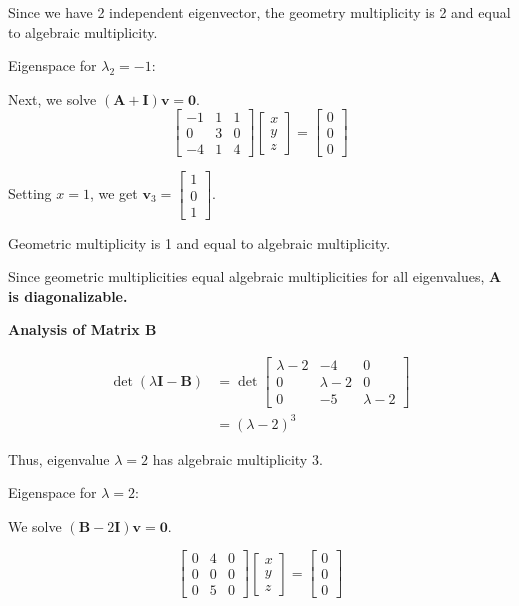 \documentclass{article}
\newcommand{\0}{{\mathbf{0}}} %
\begin{document}
Since we have 2 independent eigenvector, the geometry multiplicity is 2 and equal to algebraic multiplicity.

Eigenspace for $\lambda_2 = -1$:

Next, we solve $(\mathbf{A} + \mathbf{I})\mathbf{v} = \mathbf{0}$.
\[
\begin{bmatrix} -1 & 1 & 1 \\ 0 & 3 & 0 \\ -4 & 1 & 4
\end{bmatrix}
\begin{bmatrix} x \\ y \\ z
\end{bmatrix} =
\begin{bmatrix} 0 \\ 0 \\ 0
\end{bmatrix}
\]

Setting $x=1$, we get $\mathbf{v}_3 =
\begin{bmatrix} 1 \\ 0 \\ 1
\end{bmatrix}$.

Geometric multiplicity is 1 and equal to algebraic multiplicity.

Since geometric multiplicities equal algebraic multiplicities for all eigenvalues, \textbf{$\mathbf{A}$ is diagonalizable.}

\textbf{Analysis of Matrix B}

\begin{align*}
\det(\lambda \mathbf{I} - \mathbf{B}) &= \det
\begin{bmatrix}\lambda - 2 & -4 & 0 \\ 0 & \lambda - 2 & 0 \\ 0 & -5 & \lambda -2
\end{bmatrix}   \\
&= (\lambda - 2)^3
\end{align*}

Thus, eigenvalue $\lambda = 2$ has algebraic multiplicity 3.

Eigenspace for $\lambda = 2$:

We solve $(\mathbf{B} - 2\mathbf{I})\mathbf{v} = \mathbf{0}$.

\[
\begin{bmatrix} 0 & 4 & 0 \\ 0 & 0 & 0 \\ 0 & 5 & 0
\end{bmatrix}
\begin{bmatrix} x \\ y \\ z
\end{bmatrix} =
\begin{bmatrix} 0 \\ 0 \\ 0
\end{bmatrix}
\]
\end{document}
